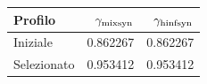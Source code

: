 \begin{tabular}{lrr}\toprule
Profilo & $\gamma_{\rm mixsyn}$ & $\gamma_{\rm hinfsyn}$\\\midrule
Iniziale & 0.862267 & 0.862267 \\
Selezionato & 0.953412 & 0.953412 \\
\bottomrule\end{tabular}
